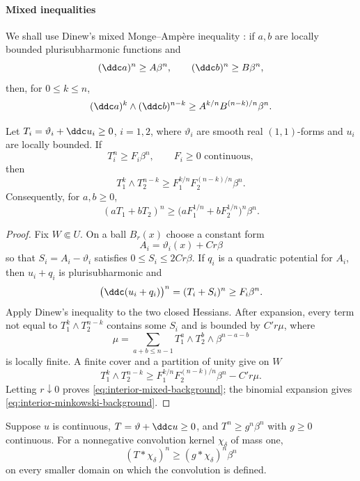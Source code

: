 \paragraph{Mixed inequalities}

We shall use Dinew's mixed Monge--Amp\`ere inequality \cite[Theorem~1.2]{Dinew09}: if $a,b$ are locally bounded plurisubharmonic functions and
\[
  (\ddc a)^n\geq A\beta^n,
  \qquad
  (\ddc b)^n\geq B\beta^n,
\]
then, for $0\leq k\leq n$,
\[
  (\ddc a)^k\wedge(\ddc b)^{n-k}
  \geq A^{k/n}B^{(n-k)/n}\beta^n.
\]

\begin{lemma}\label{lem:interior-mixed-background}
Let $T_i=\vartheta_i+\ddc u_i\geq0$, $i=1,2$, where $\vartheta_i$ are smooth real $(1,1)$-forms and $u_i$ are locally bounded. If
\[
  T_i^n\geq F_i\beta^n,
  \qquad F_i\geq0\text{ continuous},
\]
then
\begin{equation}\label{eq:interior-mixed-background}
  T_1^k\wedge T_2^{n-k}
  \geq F_1^{k/n}F_2^{(n-k)/n}\beta^n.
\end{equation}
Consequently, for $a,b\geq0$,
\begin{equation}\label{eq:interior-minkowski-background}
  (aT_1+bT_2)^n
  \geq\bigl(aF_1^{1/n}+bF_2^{1/n}\bigr)^n\beta^n.
\end{equation}
\end{lemma}

\begin{proof}
Fix $W\Subset U$. On a ball $B_r(x)$ choose a constant form
\[
  A_i=\vartheta_i(x)+Cr\beta
\]
so that $S_i=A_i-\vartheta_i$ satisfies $0\leq S_i\leq2Cr\beta$. If $q_i$ is a quadratic potential for $A_i$, then $u_i+q_i$ is plurisubharmonic and
\[
  \bigl(\ddc(u_i+q_i)\bigr)^n=(T_i+S_i)^n\geq F_i\beta^n.
\]
Apply Dinew's inequality to the two closed Hessians. After expansion, every term not equal to $T_1^k\wedge T_2^{n-k}$ contains some $S_i$ and is bounded by $C'r\mu$, where
\[
  \mu=\sum_{a+b\leq n-1}T_1^a\wedge T_2^b\wedge\beta^{n-a-b}
\]
is locally finite. A finite cover and a partition of unity give on $W$
\[
  T_1^k\wedge T_2^{n-k}
  \geq F_1^{k/n}F_2^{(n-k)/n}\beta^n-C'r\mu.
\]
Letting $r\downarrow0$ proves \eqref{eq:interior-mixed-background}; the binomial expansion gives \eqref{eq:interior-minkowski-background}.
\end{proof}

\begin{lemma}\label{lem:interior-convolution}
Suppose $u$ is continuous, $T=\vartheta+\ddc u\geq0$, and $T^n\geq g^n\beta^n$ with $g\geq0$ continuous. For a nonnegative convolution kernel $\chi_\delta$ of mass one,
\begin{equation}\label{eq:interior-convolution}
  (T*\chi_\delta)^n\geq(g*\chi_\delta)^n\beta^n
\end{equation}
on every smaller domain on which the convolution is defined.
\end{lemma}

